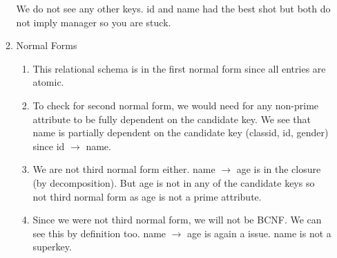 \documentclass[11pt]{article}
\begin{document}
\begin{enumerate}
\begin{enumerate}
We do not see any other keys.  id and name had the best shot but both do not imply manager so you are stuck.
\item Normal Forms
\begin{enumerate}
\item This relational schema is in the first normal form since all entries are atomic.
\item To check for second normal form, we would need for any non-prime attribute to be fully dependent on the candidate key.  We see that name is partially dependent on the candidate key (classid, id, gender) since id $\rightarrow$ name.
\item We are not third normal form either.  name $\rightarrow$ age is in the closure (by decomposition).  But age is not in any of the candidate keys so not third normal form as age is not a prime attribute.
\item Since we were not third normal form, we will not be BCNF.  We can see this by definition too.  name $\rightarrow$ age is again a issue.  name is not a superkey. 
\end{enumerate}
%
%
%
%
%
%
%
%
%
%
%
%
%
%
%


\end{enumerate}
\end{enumerate}
\end{document}
